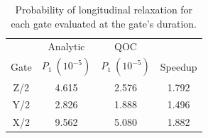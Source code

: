 \documentclass[
  amsfonts,
  amsmath,
  tbtags,
  amssymb,
  aps,
  nobibnotes,
  twocolumn,
]{revtex4-2}
\begin{document}
\begin{table}[h]
  \begin{tabular}{c | c | c | c}
    & Analytic  & QOC &\\
    Gate & $P_{1}\ (10^{-5})$ & $P_{1}\ (10^{-5})$ & Speedup\\
    \hline
    Z/2 & 4.615 & 2.576 & 1.792\\
    Y/2 & 2.826 & 1.888 & 1.496\\
    X/2 & 9.562 & 5.080 & 1.882\\
  \end{tabular}
  \caption{Probability of longitudinal relaxation for each gate
    evaluated at the gate's duration.}
\end{table}
\end{document}
